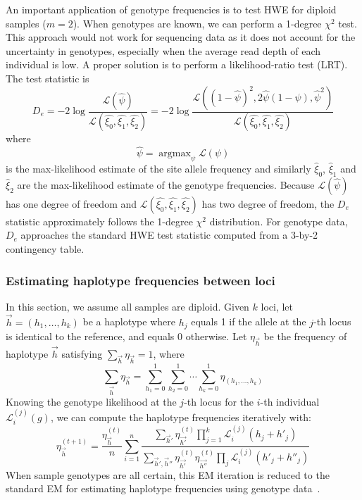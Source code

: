 \documentclass{bioinfo}
\DeclareMathOperator*{\argmax}{argmax}
\begin{document}
\begin{methods}
An important application of genotype frequencies is to test HWE
for diploid samples ($m=2$).  When genotypes are known, we can perform
a 1-degree $\chi^2$ test. This approach would not work for sequencing data as
it does not account for the uncertainty in genotypes, especially when the
average read depth of each individual is low. A
proper solution is to perform a likelihood-ratio test (LRT). The test statistic is
\begin{equation}\label{eq:hwe}
D_e=-2\log\frac{\mathcal{L}(\hat{\psi})}{\mathcal{L}(\hat{\xi_0},\hat{\xi_1},\hat{\xi_2})}
=-2\log\frac{\mathcal{L}((1-\hat{\psi})^2,2\hat{\psi}(1-\psi),\hat{\psi}^2)}{\mathcal{L}(\hat{\xi_0},\hat{\xi_1},\hat{\xi_2})}
\end{equation}
where
\begin{equation}\label{eq:psimax}
\hat{\psi}=\argmax_{\psi}\mathcal{L}(\psi)
\end{equation}
is the max-likelihood estimate of the site allele frequency and similarly
$\hat{\xi}_0$, $\hat{\xi}_1$ and $\hat{\xi}_2$ are the max-likelihood estimate
of the genotype frequencies. Because $\mathcal{L}(\hat{\psi})$ has one degree of freedom
and $\mathcal{L}(\hat{\xi_0},\hat{\xi_1},\hat{\xi_2})$ has two degree of freedom,
the $D_e$ statistic approximately follows the
1-degree $\chi^2$ distribution. For genotype data, $D_e$ approaches the standard
HWE test statistic computed from a 3-by-2 contingency table.

\subsubsection{Estimating haplotype frequencies between loci}
In this section, we assume all samples are diploid. Given $k$ loci, let
$\vec{h}=(h_1,\ldots,h_k)$ be a haplotype where $h_j$ equals 1 if the allele at
the $j$-th locus is identical to the reference, and equals 0 otherwise.  Let
$\eta_{\vec{h}}$ be the frequency of haplotype $\vec{h}$ satisfying
$\sum_{\vec{h}}\eta_{\vec{h}}=1$, where
$$
\sum_{\vec{h}}\eta_{\vec{h}}=\sum_{h_1=0}^1\sum_{h_2=0}^1\cdots\sum_{h_k=0}^1\eta_{(h_1,\ldots,h_k)}
$$
Knowing the genotype likelihood at the $j$-th locus for the $i$-th individual
$\mathcal{L}^{(j)}_i(g)$, we can compute the haplotype frequencies iteratively
with:
\begin{equation}\label{equ:hf}
\eta^{(t+1)}_{\vec{h}}=\frac{\eta_{\vec{h}}^{(t)}}{n}\sum_{i=1}^n\frac{\sum_{\vec{h}'}\eta_{\vec{h'}}^{(t)}\prod_{j=1}^k\mathcal{L}^{(j)}_i(h_j+h'_j)}
{\sum_{\vec{h}',\vec{h}''}\eta_{\vec{h'}}^{(t)}\eta_{\vec{h''}}^{(t)}\prod_{j}\mathcal{L}^{(j)}_i(h'_j+h''_j)}
\end{equation}
When sample genotypes are all certain, this EM iteration is reduced to the
standard EM for estimating haplotype frequencies using genotype
data~\citep{Excoffier:1995ly}.


\end{methods}
\end{document}
